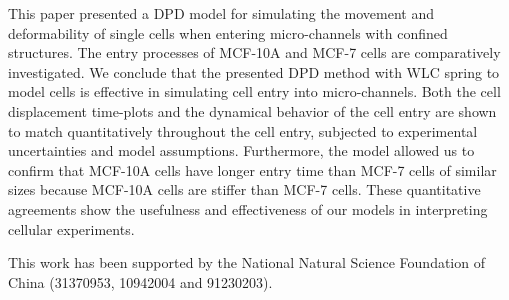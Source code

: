 \documentclass[%
 reprint,
 amsmath,amssymb,
 aps,
]{revtex4-1}
\begin{document}
This paper presented a DPD model for simulating the movement and deformability of single cells when entering micro-channels with confined structures.  The entry processes of MCF-10A and MCF-7 cells are comparatively investigated. We conclude that the presented DPD method with WLC spring to model cells is effective in simulating cell entry into micro-channels. Both the cell displacement time-plots and the dynamical behavior of the cell entry are shown to match quantitatively throughout the cell entry, subjected to experimental uncertainties and model assumptions. Furthermore, the model allowed us to confirm that MCF-10A cells have longer entry time than MCF-7 cells of similar sizes because MCF-10A cells are stiffer than MCF-7 cells. These quantitative agreements show the usefulness and effectiveness of our models in interpreting cellular experiments.


\begin{acknowledgments}
This work has been supported by the National Natural Science Foundation of China (31370953, 10942004 and 91230203).
\end{acknowledgments}



\end{document}
